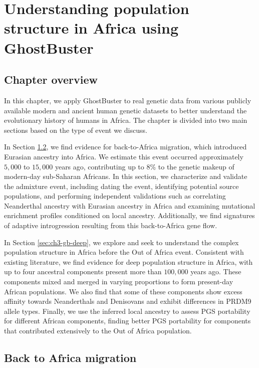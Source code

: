 \chapter{\label{ch:3-gb-result}Understanding population structure in Africa using GhostBuster}

\minitoc

\section{Chapter overview}

In this chapter, we apply GhostBuster to real genetic data from various publicly available modern and ancient human genetic datasets to better understand the evolutionary history of humans in Africa. The chapter is divided into two main sections based on the type of event we discuss.

In Section \ref{sec:ch3-gb-bta}, we find evidence for back-to-Africa migration, which introduced Eurasian ancestry into Africa. We estimate this event occurred approximately $5{,}000$ to $15{,}000$ years ago, contributing up to 8\% to the genetic makeup of modern-day sub-Saharan Africans. In this section, we characterize and validate the admixture event, including dating the event, identifying potential source populations, and performing independent validations such as correlating Neanderthal ancestry with Eurasian ancestry in Africa and examining mutational enrichment profiles conditioned on local ancestry. Additionally, we find signatures of adaptive introgression resulting from this back-to-Africa gene flow.

In Section \ref{sec:ch3-gb-deep}, we explore and seek to understand the complex population structure in Africa before the Out of Africa event. Consistent with existing literature, we find evidence for deep population structure in Africa, with up to four ancestral components present more than $100{,}000$ years ago. These components mixed and merged in varying proportions to form present-day African populations. We also find that some of these components show excess affinity towards Neanderthals and Denisovans and exhibit differences in PRDM9 allele types. Finally, we use the inferred local ancestry to assess PGS portability for different African components, finding better PGS portability for components that contributed extensively to the Out of Africa population.  

 
\section{Back to Africa migration}
\label{sec:ch3-gb-bta}

